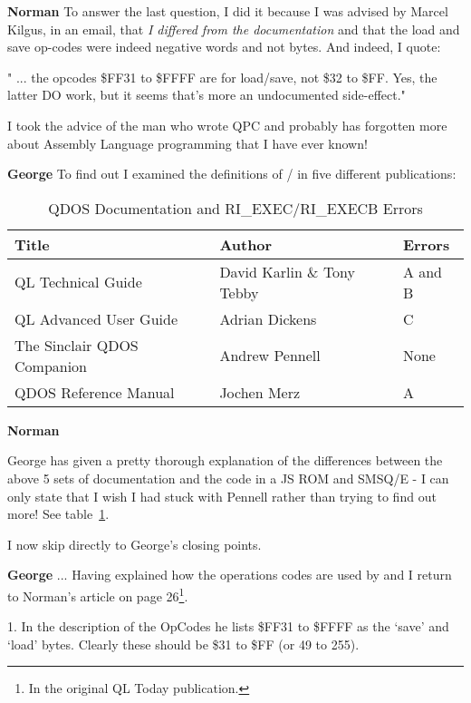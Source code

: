 {\bf Norman} 
To answer the last question, I
    did it because I was advised by Marcel Kilgus, in an email, that \emph{I
    differed from the documentation} and that the load and save op-{}codes were
    indeed negative words and not bytes. And indeed, I quote:



" ... the opcodes \$FF31 to \$FFFF are for load/save, not \$32 to \$FF.
    Yes, the latter DO work, but it seems that's more an undocumented
    side-{}effect."

I took the advice of the man who wrote QPC and probably has
    forgotten more about Assembly Language programming that I have ever
    known!

{\bf George} 
To find out I examined the
    definitions of / in five different publications:

\begin{table}[htbp]
\centering
\begin{tabular}{l l l}
\toprule
\textbf{Title} & \textbf{Author} & \textbf{Errors} \\
\midrule
%
QL Technical Guide          & David Karlin \& Tony Tebby & A and B \\
QL Advanced User Guide      & Adrian Dickens & C \\
The Sinclair QDOS Companion & Andrew Pennell & None \\
QDOS Reference Manual       & Jochen Merz    & A \\
%
\bottomrule
\end{tabular}
\caption{QDOS Documentation and RI\_EXEC/RI\_EXECB Errors}
\label{tab:RIEXECErrors}
\end{table}


{\bf Norman} 

George has given a pretty thorough explanation of the differences
    between the above 5 sets of documentation and the code in a JS ROM and
    SMSQ/E -{} I can only state that I wish I had stuck with Pennell rather than
    trying to find out more! See table~\ref{tab:RIEXECErrors}.

I now skip directly to George's closing points.

{\bf George} 
... Having explained how the
    operations codes are used by  and  I return to Norman's
    article on page 26\footnote{In the original QL Today publication.}.



1. In the description of the OpCodes he lists \$FF31 to \$FFFF as the
    `save' and `load' bytes. Clearly these should be \$31 to \$FF (or 49 to
    255).

